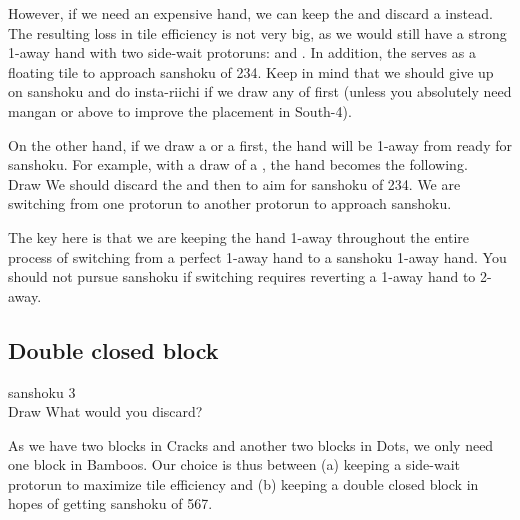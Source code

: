 \bigskip
However, if we need an expensive hand, we can keep the {\large{}} and discard a {\large{}} instead. The resulting loss in tile efficiency is not very big, as we would still have a strong 1-away hand with two side-wait protoruns: {\large{}} and {\large{}}. In addition, the {\large{}} serves as a floating tile to approach {\jap sanshoku} of 234. 
Keep in mind that we should give up on {\jap sanshoku} and do insta-{\jap riichi} if we draw any of {\large{}} first (unless you absolutely need {\jap mangan} or above to improve the placement in South-4). 

\bigskip
On the other hand, if we draw a {\large{}} or a {\large{}} first, the hand will be 1-away from ready for {\jap sanshoku}. For example, with a draw of a {\large{}}, the hand becomes the following. 
\bp
{}~\\
\hspace{290pt}\footnotesize{Draw}
\ep
We should discard the {\large{}} and then {\large{}} to aim for {\jap sanshoku} of 234. We are switching from one protorun {\large{}} to another protorun {\large{}} to approach {\jap sanshoku}. 

\bigskip
The key here is that we are keeping the hand 1-away throughout the entire process of switching from a perfect 1-away hand to a {\jap sanshoku} 1-away hand. You should not pursue {\jap sanshoku} if switching requires reverting a 1-away hand to 2-away. 


\newpage
\subsection{Double closed block}\label{sec:san3}

\begin{itembox}[r]{{\jap sanshoku} 3}
\bp
{}~\\
\hspace{290pt}\footnotesize{Draw}
\ep
\vspace{-17pt}What would you discard? \vspace{-5pt}
\end{itembox}
\noindent
As we have two blocks in Cracks and another two blocks in Dots, we only need one block in Bamboos. Our choice is thus between (a) keeping a side-wait protorun {\large{}} to maximize tile efficiency and (b) keeping a double closed block {\large{}} in hopes of getting {\jap sanshoku} of 567. 

